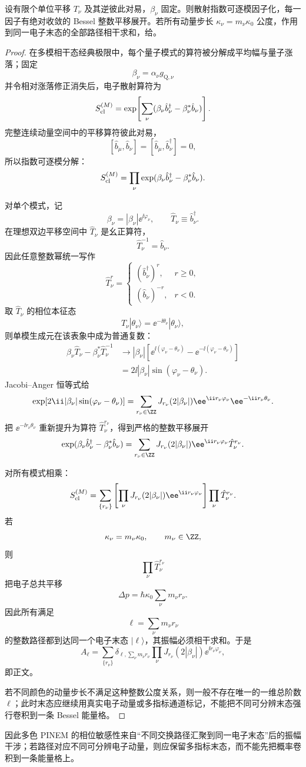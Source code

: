 \begin{proposition}
设有限个单位平移 $T_\nu$ 及其逆彼此对易，$\beta_\nu$ 固定。则散射指数可逐模因子化，每一因子有绝对收敛的 Bessel 整数平移展开。若所有动量步长 $\kappa_\nu=m_\nu\kappa_0$ 公度，作用到同一电子末态的全部路径相干求和，给。
\end{proposition}
\begin{proof}
在多模相干态经典极限中，每个量子模式的算符被分解成平均幅与量子涨落；固定
\[
\beta_\nu=\alpha_\nu g_{\mathrm Q,\nu}
\]
并令相对涨落修正消失后，电子散射算符为
\[
S_{\rm cl}^{(M)}
=
\exp\!\left[
\sum_\nu
(\beta_\nu\hat b_\nu^\dagger-\beta_\nu^*\hat b_\nu)
\right].
\]
完整连续动量空间中的平移算符彼此对易，
\[
[\hat b_\mu,\hat b_\nu]=
[\hat b_\mu,\hat b_\nu^\dagger]=0,
\]
所以指数可逐模分解：
\[
S_{\rm cl}^{(M)}
=
\prod_\nu
\exp(
\beta_\nu\hat b_\nu^\dagger
-\beta_\nu^*\hat b_\nu).
\]

对单个模式，记
\[
\beta_\nu=|\beta_\nu|\ee^{\ii\varphi_\nu},
\qquad
\hat T_\nu\equiv\hat b_\nu^\dagger.
\]
在理想双边平移空间中 $\hat T_\nu$ 是幺正算符，
\[
\hat T_\nu^{-1}=\hat b_\nu.
\]
因此任意整数幂统一写作
\[
\hat T_\nu^{r}
=
\begin{cases}
(\hat b_\nu^\dagger)^r,&r\ge0,\\
(\hat b_\nu)^{-r},&r<0.
\end{cases}
\]
取 $\hat T_\nu$ 的相位本征态
\[
\hat T_\nu|\theta_\nu\rangle
=
\ee^{-\ii\theta_\nu}|\theta_\nu\rangle,
\]
则单模生成元在该表象中成为普通复数：
\begin{align*}
\beta_\nu\hat T_\nu-\beta_\nu^*\hat T_\nu^{-1}
&\longrightarrow
|\beta_\nu|
\left[
\ee^{\ii(\varphi_\nu-\theta_\nu)}
-\ee^{-\ii(\varphi_\nu-\theta_\nu)}
\right]\\
&=
2\ii|\beta_\nu|
\sin(\varphi_\nu-\theta_\nu).
\end{align*}
Jacobi--Anger 恒等式给
\[
\exp[
2\ii|\beta_\nu|\sin(\varphi_\nu-\theta_\nu)
]
=
\sum_{r_\nu\in\ZZ}
J_{r_\nu}(2|\beta_\nu|)
\ee^{\ii r_\nu\varphi_\nu}
\ee^{-\ii r_\nu\theta_\nu}.
\]
把
$\ee^{-\ii r_\nu\theta_\nu}$
重新提升为算符 $\hat T_\nu^{r_\nu}$，得到严格的整数平移展开
\[
\exp(
\beta_\nu\hat b_\nu^\dagger
-\beta_\nu^*\hat b_\nu)
=
\sum_{r_\nu\in\ZZ}
J_{r_\nu}(2|\beta_\nu|)
\ee^{\ii r_\nu\varphi_\nu}
\hat T_\nu^{r_\nu}.
\]

对所有模式相乘：
\[
S_{\rm cl}^{(M)}
=
\sum_{\{r_\nu\}}
\left[
\prod_\nu
J_{r_\nu}(2|\beta_\nu|)
\ee^{\ii r_\nu\varphi_\nu}
\right]
\prod_\nu\hat T_\nu^{r_\nu}.
\]
若
\[
\kappa_\nu=m_\nu\kappa_0,
\qquad
m_\nu\in\ZZ,
\]
则
\[
\prod_\nu\hat T_\nu^{r_\nu}
\]
把电子总共平移
\[
\Delta p
=
\hbar\kappa_0
\sum_\nu m_\nu r_\nu.
\]
因此所有满足
\[
\ell=\sum_\nu m_\nu r_\nu
\]
的整数路径都到达同一个电子末态 $|\ell\rangle$，其振幅必须相干求和。于是
\[
A_\ell
=
\sum_{\{r_\nu\}}
\delta_{\ell,\sum_\nu m_\nu r_\nu}
\prod_\nu
J_{r_\nu}(2|\beta_\nu|)
\ee^{\ii r_\nu\varphi_\nu},
\]
即正文。

若不同颜色的动量步长不满足这种整数公度关系，则一般不存在唯一的一维总阶数 $\ell$；此时末态应继续用真实电子动量或多指标通道标记，不能把不同可分辨末态强行卷积到一条 Bessel 能量格。
\end{proof}

因此多色 PINEM 的相位敏感性来自“不同交换路径汇聚到同一电子末态”后的振幅干涉；若路径对应不同可分辨电子动量，则应保留多指标末态，而不能先把概率卷积到一条能量格上。
